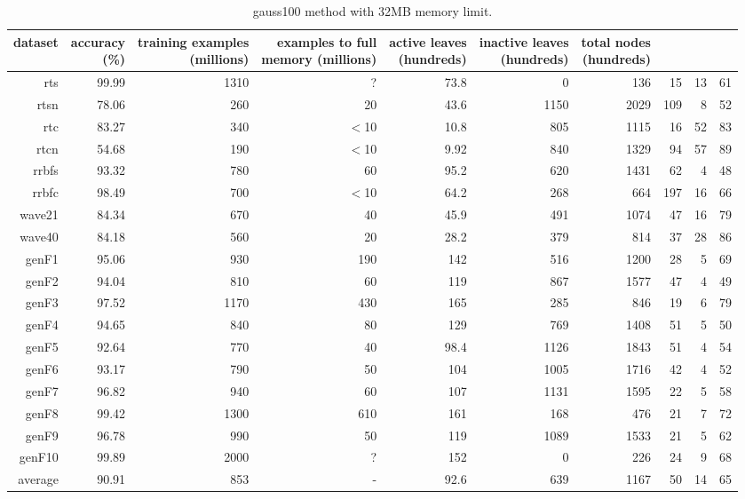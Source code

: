 \clearpage
\begin{table}
\caption{{\sc gauss100} method with 32MB memory limit.}
\label{tab:gauss100-32MB}
\centering
\begin{tabular}{|r|r|r|r|r|r|r|r|r|r|}
\hline
dataset	&
\rotatebox{90}{\parbox{9em}{accuracy\\(\%)}} &
\rotatebox{90}{\parbox{9em}{training examples\\(millions)}} &
\rotatebox{90}{\parbox{9em}{examples to full\\memory (millions)}} &
\rotatebox{90}{\parbox{9em}{active leaves\\(hundreds)}} &
\rotatebox{90}{\parbox{9em}{inactive leaves\\(hundreds)}} &
\rotatebox{90}{\parbox{9em}{total nodes\\(hundreds)}} &
\rotatebox{90}{\parbox{9em}{tree depth}}	&
\rotatebox{90}{\parbox{9em}{training speed (\%)}} &
\rotatebox{90}{\parbox{9em}{prediction speed (\%)}} \\
\hline
{\sc rts} & 99.99 & 1310 & ? & 73.8 & 0 & 136 & 15 & 13 & 61 \\
{\sc rtsn} & 78.06 & 260 & 20 & 43.6 & 1150 & 2029 & 109 & 8 & 52 \\
{\sc rtc} & 83.27 & 340 & $<$10 & 10.8 & 805 & 1115 & 16 & 52 & 83 \\
{\sc rtcn} & 54.68 & 190 & $<$10 & 9.92 & 840 & 1329 & 94 & 57 & 89 \\
{\sc rrbfs} & 93.32 & 780 & 60 & 95.2 & 620 & 1431 & 62 & 4 & 48 \\
{\sc rrbfc} & 98.49 & 700 & $<$10 & 64.2 & 268 & 664 & 197 & 16 & 66 \\
{\sc wave21} & 84.34 & 670 & 40 & 45.9 & 491 & 1074 & 47 & 16 & 79 \\
{\sc wave40} & 84.18 & 560 & 20 & 28.2 & 379 & 814 & 37 & 28 & 86 \\
{\sc genF1} & 95.06 & 930 & 190 & 142 & 516 & 1200 & 28 & 5 & 69 \\
{\sc genF2} & 94.04 & 810 & 60 & 119 & 867 & 1577 & 47 & 4 & 49 \\
{\sc genF3} & 97.52 & 1170 & 430 & 165 & 285 & 846 & 19 & 6 & 79 \\
{\sc genF4} & 94.65 & 840 & 80 & 129 & 769 & 1408 & 51 & 5 & 50 \\
{\sc genF5} & 92.64 & 770 & 40 & 98.4 & 1126 & 1843 & 51 & 4 & 54 \\
{\sc genF6} & 93.17 & 790 & 50 & 104 & 1005 & 1716 & 42 & 4 & 52 \\
{\sc genF7} & 96.82 & 940 & 60 & 107 & 1131 & 1595 & 22 & 5 & 58 \\
{\sc genF8} & 99.42 & 1300 & 610 & 161 & 168 & 476 & 21 & 7 & 72 \\
{\sc genF9} & 96.78 & 990 & 50 & 119 & 1089 & 1533 & 21 & 5 & 62 \\
{\sc genF10} & 99.89 & 2000 & ? & 152 & 0 & 226 & 24 & 9 & 68 \\
\hline
average & 90.91 & 853 &  -  & 92.6 & 639 & 1167 & 50 & 14 & 65 \\
\hline
\end{tabular}
\end{table}
